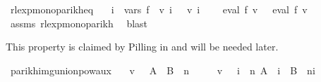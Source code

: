 \begin{isabellebody}
\endisatagproof
{\isafoldproof}%
%
\isadelimproof
\isanewline
%
\endisadelimproof
\isanewline
{}\isamarkupfalse%
\ rlexp{\isacharunderscore}{\kern0pt}mono{\isacharunderscore}{\kern0pt}parikh{\isacharunderscore}{\kern0pt}eq{\isacharcolon}{\kern0pt}\isanewline
\ \ \ {\isachardoublequoteopen}{\isasymforall}i\ {\isasymin}\ vars\ f{\isachardot}{\kern0pt}\ {\isasymPsi}\ {\isacharparenleft}{\kern0pt}v\ i{\isacharparenright}{\kern0pt}\ {\isacharequal}{\kern0pt}\ {\isasymPsi}\ {\isacharparenleft}{\kern0pt}v{\isacharprime}{\kern0pt}\ i{\isacharparenright}{\kern0pt}{\isachardoublequoteclose}\isanewline
\ \ \ {\isachardoublequoteopen}{\isasymPsi}\ {\isacharparenleft}{\kern0pt}eval\ f\ v{\isacharparenright}{\kern0pt}\ {\isacharequal}{\kern0pt}\ {\isasymPsi}\ {\isacharparenleft}{\kern0pt}eval\ f\ v{\isacharprime}{\kern0pt}{\isacharparenright}{\kern0pt}{\isachardoublequoteclose}\isanewline
%
\isadelimproof
\ \ %
\endisadelimproof
%
\isatagproof
{}\isamarkupfalse%
\ assms\ rlexp{\isacharunderscore}{\kern0pt}mono{\isacharunderscore}{\kern0pt}parikh\ \isamarkupfalse%
\ blast%
\endisatagproof
{\isafoldproof}%
%
\isadelimproof
%
\endisadelimproof
%
\isadelimdocument
%
\endisadelimdocument
%
\isatagdocument
%
\isamarkuptrue%
%
\endisatagdocument
{\isafolddocument}%
%
\isadelimdocument
%
\endisadelimdocument
%
\begin{isamarkuptext}%
This property is claimed by Pilling in \cite{Pilling} and will be needed later.%
\end{isamarkuptext}\isamarkuptrue%
\isamarkupfalse%
\ parikh{\isacharunderscore}{\kern0pt}img{\isacharunderscore}{\kern0pt}union{\isacharunderscore}{\kern0pt}pow{\isacharunderscore}{\kern0pt}aux{}{\isacharcolon}{\kern0pt}\isanewline
\ \ \ {\isachardoublequoteopen}v\ {\isasymin}\ {\isasymPsi}\ {\isacharparenleft}{\kern0pt}{\isacharparenleft}{\kern0pt}A\ {\isasymunion}\ B{\isacharparenright}{\kern0pt}\ {\isacharcircum}{\kern0pt}{\isacharcircum}{\kern0pt}\ n{\isacharparenright}{\kern0pt}{\isachardoublequoteclose}\isanewline
\ \ \ \ \ {\isachardoublequoteopen}v\ {\isasymin}\ {\isasymPsi}\ {\isacharparenleft}{\kern0pt}{\isasymUnion}i\ {\isasymle}\ n{\isachardot}{\kern0pt}\ A\ {\isacharcircum}{\kern0pt}{\isacharcircum}{\kern0pt}\ i\ {\isacharat}{\kern0pt}{\isacharat}{\kern0pt}\ B\ {\isacharcircum}{\kern0pt}{\isacharcircum}{\kern0pt}\ {\isacharparenleft}{\kern0pt}n{\isacharminus}{\kern0pt}i{\isacharparenright}{\kern0pt}{\isacharparenright}{\kern0pt}{\isachardoublequoteclose}\isanewline

\end{isabellebody}
